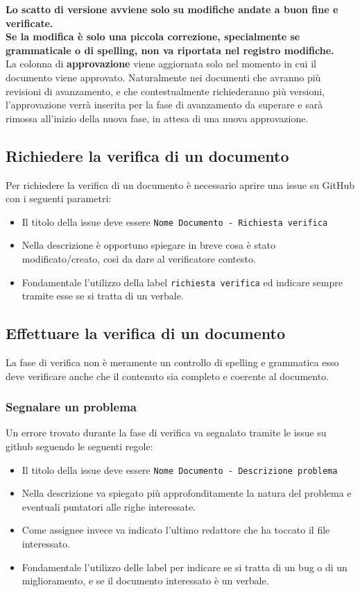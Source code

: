 \noindent
\textbf{Lo scatto di versione avviene solo su modifiche andate a buon fine e verificate.}
\\

\noindent
\textbf{Se la modifica è solo una piccola correzione, specialmente se grammaticale o di
spelling, non va riportata nel registro modifiche.}\\


\noindent
La colonna di \textbf{approvazione} viene aggiornata solo nel momento in cui il documento viene approvato. Naturalmente nei documenti che avranno più revisioni di avanzamento, e che contestualmente richiederanno più versioni, l'approvazione verrà inserita per la fase di avanzamento da superare e sarà rimossa all'inizio della nuova fase, in attesa di una nuova approvazione.

\subsection{Richiedere la verifica di un documento}
Per richiedere la verifica di un documento è necessario aprire una issue su GitHub con
i seguenti parametri:
\begin{itemize}
    \item Il titolo della issue deve essere
    \texttt{Nome Documento - Richiesta verifica}
    \item Nella descrizione è opportuno spiegare in breve cosa è stato modificato/creato,
    così da dare al verificatore contesto.
    \item Fondamentale l'utilizzo della label \texttt{richiesta verifica} ed indicare
    sempre tramite esse se si tratta di un verbale.
\end{itemize}

\subsection{Effettuare la verifica di un documento}
La fase di verifica non è meramente un controllo di spelling e grammatica esso
deve verificare anche che il contenuto sia completo e coerente al documento.

\subsubsection{Segnalare un problema}
Un errore trovato durante la fase di verifica va segnalato tramite le issue su github
seguendo le seguenti regole:
\begin{itemize}
    \item Il titolo della issue deve essere
    \texttt{Nome Documento - Descrizione problema}
    \item Nella descrizione va spiegato più approfonditamente la natura del
    problema e eventuali puntatori alle righe interessate.
    \item  Come assignee invece va indicato l'ultimo redattore che ha toccato il file
    interessato.
    \item Fondamentale l'utilizzo delle label per indicare se si tratta
    di un bug o di un miglioramento, e se il documento interessato è un verbale.
\end{itemize}

